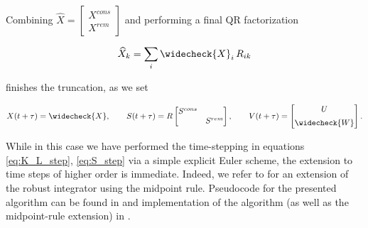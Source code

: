 Combining $\widehat{ X } = \begin{bmatrix} X^{cons} \\ X^{rem} \end{bmatrix}$ and 
performing a final QR factorization

\begin{equation}
    \widehat{ X }_k = \sum_i \widecheck{ X }_i\, R_{i k}
\end{equation}

finishes the truncation, as we set

\begin{equation}
    X (t + \tau) = \widecheck{ X }, \quad\quad 
    S (t + \tau) = R \begin{bmatrix}
        S^{cons} & \\
        & S^{rem}
    \end{bmatrix}, \quad\quad
    V (t + \tau) = \begin{bmatrix}
        U \\[0.5em] 
        \widecheck{ W }
    \end{bmatrix} . 
\end{equation}

While in this case we have performed the time-stepping in equations \ref{eq:K_L_step}, 
\ref{eq:S_step} via a simple explicit Euler scheme, the extension to time steps of higher 
order is immediate. Indeed, we refer to \cite{ceruti2024} for an extension of the robust 
integrator using the midpoint rule. Pseudocode for the presented algorithm can be found 
in \cite{robustlowrank} and implementation of the algorithm (as well as the midpoint-rule 
extension) in \cite{BUGimplementation}. 

